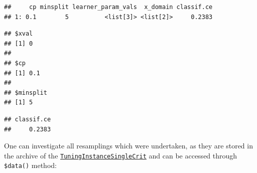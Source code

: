 \documentclass[]{scrbook}
\newenvironment{Shaded}{\begin{snugshade}}{\end{snugshade}}
\newcommand{\KeywordTok}[1]{\textcolor[rgb]{0.13,0.29,0.53}{\textbf{#1}}}
\newcommand{\NormalTok}[1]{#1}
\newcommand{\OperatorTok}[1]{\textcolor[rgb]{0.81,0.36,0.00}{\textbf{#1}}}
\renewenvironment{Shaded} {\begin{snugshade}\small} {\end{snugshade}}
\begin{document}
\begin{verbatim}
##     cp minsplit learner_param_vals  x_domain classif.ce
## 1: 0.1        5          <list[3]> <list[2]>     0.2383
\end{verbatim}

\begin{Shaded}
\end{Shaded}

\begin{verbatim}
## $xval
## [1] 0
## 
## $cp
## [1] 0.1
## 
## $minsplit
## [1] 5
\end{verbatim}

\begin{Shaded}
\end{Shaded}

\begin{verbatim}
## classif.ce 
##     0.2383
\end{verbatim}

One can investigate all resamplings which were undertaken, as they are stored in the archive of the \href{https://mlr3tuning.mlr-org.com/reference/TuningInstanceSingleCrit.html}{\texttt{TuningInstanceSingleCrit}} and can be accessed through \texttt{\$data()} method:

\begin{Shaded}
\end{Shaded}
\end{document}
